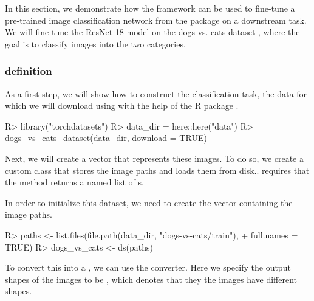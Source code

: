 \documentclass[article]{jss}
\theoremstyle{definition}
\begin{document}
In this section, we demonstrate how the  framework can be used to fine-tune a pre-trained image classification network from the  package on a downstream task.
We will fine-tune the ResNet-18 model \citep{ref-he2015deepresiduallearningimage} on the dogs vs. cats dataset \citep{ref-dogs-vs-cats2013}, where the goal is to classify images into the two categories.

\subsubsection[Task definition]{ definition}

As a first step, we will show how to construct the classification task, the data for which we will download using with the help of the  R package \citep{torchdatasets}.

\begin{CodeInput}
R> library("torchdatasets")
R> data_dir = here::here("data")
R> dogs_vs_cats_dataset(data_dir, download = TRUE)
\end{CodeInput}

Next, we will create a  vector that represents these images.
To do so, we create a custom  class that stores the image paths and loads them from disk..
 requires that the  method returns a named list of s.


In order to initialize this dataset, we need to create the vector containing the image paths.

\begin{CodeInput}
R> paths <- list.files(file.path(data_dir, "dogs-vs-cats/train"),
+    full.names = TRUE)
R> dogs_vs_cats <- ds(paths)
\end{CodeInput}

To convert this into a , we can use the  converter.
Here we specify the output shapes of the images to be , which denotes that they the images have different shapes.
\end{document}
